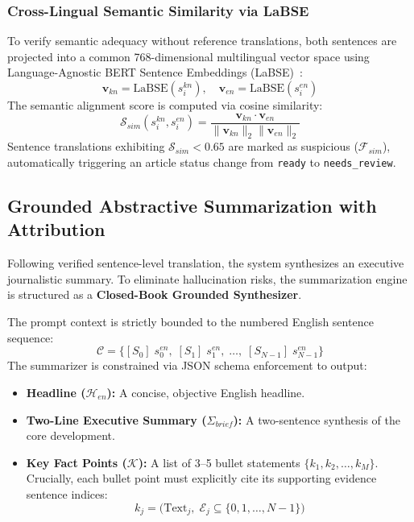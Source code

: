 \documentclass[conference]{IEEEtran}
\begin{document}
\subsubsection{Cross-Lingual Semantic Similarity via LaBSE}
To verify semantic adequacy without reference translations, both sentences are projected into a common 768-dimensional multilingual vector space using Language-Agnostic BERT Sentence Embeddings (LaBSE)~\cite{feng2022language}:
\begin{equation}
    \mathbf{v}_{kn} = \text{LaBSE}(s_i^{kn}), \quad \mathbf{v}_{en} = \text{LaBSE}(s_i^{en})
    \label{eq:labse_embeddings}
\end{equation}
The semantic alignment score is computed via cosine similarity:
\begin{equation}
    \mathcal{S}_{sim}(s_i^{kn}, s_i^{en}) = \frac{\mathbf{v}_{kn} \cdot \mathbf{v}_{en}}{\|\mathbf{v}_{kn}\|_2 \|\mathbf{v}_{en}\|_2}
    \label{eq:cosine_sim}
\end{equation}
Sentence translations exhibiting $\mathcal{S}_{sim} < 0.65$ are marked as suspicious ($\mathcal{F}_{sim}$), automatically triggering an article status change from \texttt{ready} to \texttt{needs\_review}.

\subsection{Grounded Abstractive Summarization with Attribution}
Following verified sentence-level translation, the system synthesizes an executive journalistic summary. To eliminate hallucination risks, the summarization engine is structured as a \textbf{Closed-Book Grounded Synthesizer}.

The prompt context is strictly bounded to the numbered English sentence sequence:
\begin{equation}
    \mathcal{C} = \big\{ [S_0]\; s_0^{en}, \; [S_1]\; s_1^{en}, \; \dots, \; [S_{N-1}]\; s_{N-1}^{en} \big\}
    \label{eq:context_prompt}
\end{equation}
The summarizer is constrained via JSON schema enforcement to output:
\begin{itemize}
    \item \textbf{Headline ($\mathcal{H}_{en}$):} A concise, objective English headline.
    \item \textbf{Two-Line Executive Summary ($\Sigma_{brief}$):} A two-sentence synthesis of the core development.
    \item \textbf{Key Fact Points ($\mathcal{K}$):} A list of 3--5 bullet statements $\{k_1, k_2, \dots, k_M\}$. Crucially, each bullet point must explicitly cite its supporting evidence sentence indices:
    \begin{equation}
        k_j = \big( \text{Text}_j, \; \mathcal{E}_j \subseteq \{0, 1, \dots, N-1\} \big)
        \label{eq:key_point_evidence}
    \end{equation}
\end{itemize}
\end{document}
